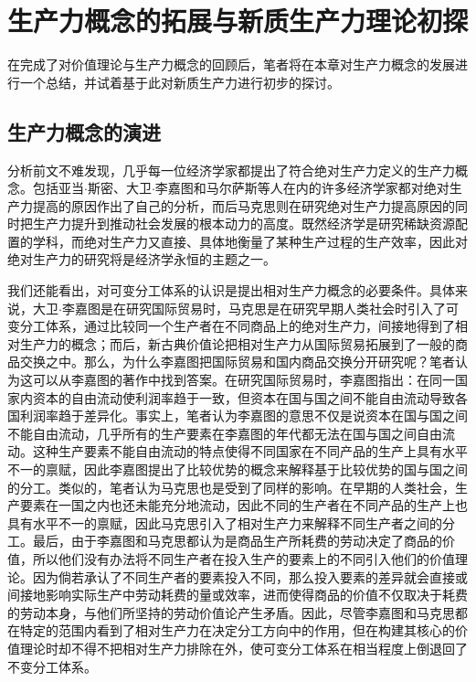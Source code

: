 
\chapter{生产力概念的拓展与新质生产力理论初探}

在完成了对价值理论与生产力概念的回顾后，笔者将在本章对生产力概念的发展进行一个总结，并试着基于此对新质生产力进行初步的探讨。

\section{生产力概念的演进}

分析前文不难发现，几乎每一位经济学家都提出了符合绝对生产力定义的生产力概念。包括亚当$\cdot$斯密、大卫$\cdot$李嘉图和马尔萨斯等人在内的许多经济学家都对绝对生产力提高的原因作出了自己的分析，而后马克思则在研究绝对生产力提高原因的同时把生产力提升到推动社会发展的根本动力的高度\cite[148-149]{LiZhengFaZhanXinZhiShengChanLiDeLiLunLiShiHeXianShiSanChongLuoJi2023}\cite[520]{ZhongGongZhongYangMaKeSiEnGeSiLieNingSiDaLinZhuZuoBianYiJuMaKeSiEnGeSiWenJiDi1Juan2009}\cite[33-34]{ZhongGongZhongYangMaKeSiEnGeSiLieNingSiDaLinZhuZuoBianYiJuMaKeSiEnGeSiQuanJiDi3Juan1960}。既然经济学是研究稀缺资源配置的学科，而绝对生产力又直接、具体地衡量了某种生产过程的生产效率，因此对绝对生产力的研究将是经济学永恒的主题之一。

我们还能看出，对可变分工体系的认识是提出相对生产力概念的必要条件。具体来说，大卫$\cdot$李嘉图是在研究国际贸易时，马克思是在研究早期人类社会时引入了可变分工体系，通过比较同一个生产者在不同商品上的绝对生产力，间接地得到了相对生产力的概念；而后，新古典价值论把相对生产力从国际贸易拓展到了一般的商品交换之中。那么，为什么李嘉图把国际贸易和国内商品交换分开研究呢？笔者认为这可以从李嘉图的著作中找到答案。在研究国际贸易时，李嘉图指出：在同一国家内资本的自由流动使利润率趋于一致，但资本在国与国之间不能自由流动导致各国利润率趋于差异化\cite[111,113]{DaWei*LiJiaTuZhengZhiJingJiXueJiFuShuiYuanLi2021}。事实上，笔者认为李嘉图的意思不仅是说资本在国与国之间不能自由流动，几乎所有的生产要素在李嘉图的年代都无法在国与国之间自由流动。这种生产要素不能自由流动的特点使得不同国家在不同产品的生产上具有水平不一的禀赋，因此李嘉图提出了比较优势的概念来解释基于比较优势的国与国之间的分工。类似的，笔者认为马克思也是受到了同样的影响。在早期的人类社会，生产要素在一国之内也还未能充分地流动，因此不同的生产者在不同产品的生产上也具有水平不一的禀赋，因此马克思引入了相对生产力来解释不同生产者之间的分工。最后，由于李嘉图和马克思都认为是商品生产所耗费的劳动决定了商品的价值，所以他们没有办法将不同生产者在投入生产的要素上的不同引入他们的价值理论。因为倘若承认了不同生产者的要素投入不同，那么投入要素的差异就会直接或间接地影响实际生产中劳动耗费的量或效率，进而使得商品的价值不仅取决于耗费的劳动本身，与他们所坚持的劳动价值论产生矛盾。因此，尽管李嘉图和马克思都在特定的范围内看到了相对生产力在决定分工方向中的作用，但在构建其核心的价值理论时却不得不把相对生产力排除在外，使可变分工体系在相当程度上倒退回了不变分工体系。

